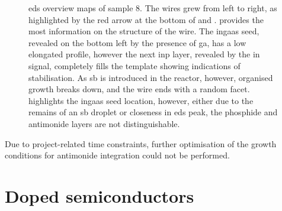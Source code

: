 \begin{figure}
{
    }
    \caption[\acs{eds} overview maps of sample 8.]{\acs{eds} overview maps of sample 8. The wires grew from left to right, as highlighted by the red arrow at the bottom of  and .  provides the most information on the structure of the wire. The \acs{ingaas} seed, revealed on the bottom left by the presence of \acs{ga}, has a low elongated profile, however the next \acs{inp} layer, revealed by the \acs{in} signal, completely fills the template showing indications of  stabilisation. As \acs{sb} is introduced in the reactor, however, organised growth breaks down, and the wire ends with a random facet.  highlights the \acs{ingaas} seed location, however, either due to the remains of an \acs{sb} droplet or closeness in \acs{eds} peak, the phosphide and antimonide layers are not distinguishable.}
    \label{fig:s8_EDS_maps}
\end{figure}

Due to project-related time constraints, further optimisation of the growth conditions for antimonide integration could not be performed.

\section{Doped semiconductors}

